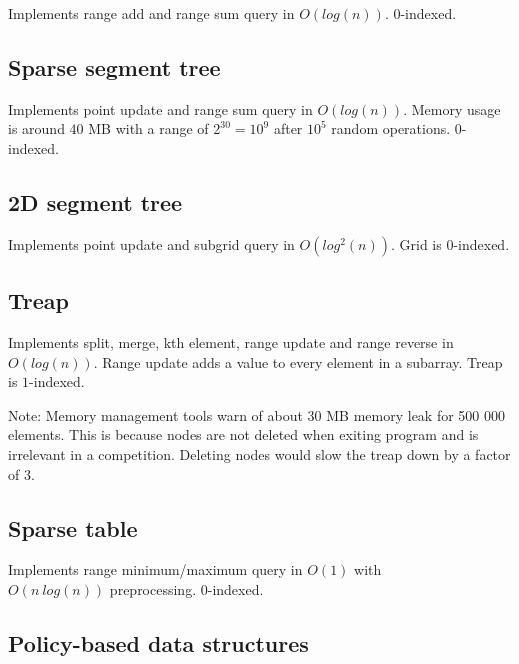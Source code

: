 \documentclass{article}
\begin{document}
Implements range add and range sum query in $O(log(n))$. $0$-indexed.



\subsection {Sparse segment tree}

Implements point update and range sum query in $O(log(n))$. Memory usage is around $40$ MB with a range of $2^{30} = 10^9$ after $10^5$ random operations. $0$-indexed.



\subsection {2D segment tree}

Implements point update and subgrid query in $O(log^2(n))$. Grid is $0$-indexed.



\subsection {Treap}

Implements split, merge, kth element, range update and range reverse in $O(log(n))$. Range update adds a value to every element in a subarray. Treap is $1$-indexed.

Note: Memory management tools warn of about 30 MB memory leak for 500 000 elements. This is because nodes are not deleted when exiting program and is irrelevant in a competition. Deleting nodes would slow the treap down by a factor of 3.



\subsection {Sparse table}

Implements range minimum/maximum query in $O(1)$ with \\ $O(n \ log(n))$ preprocessing. $0$-indexed.



\subsection {Policy-based data structures}
\end{document}
